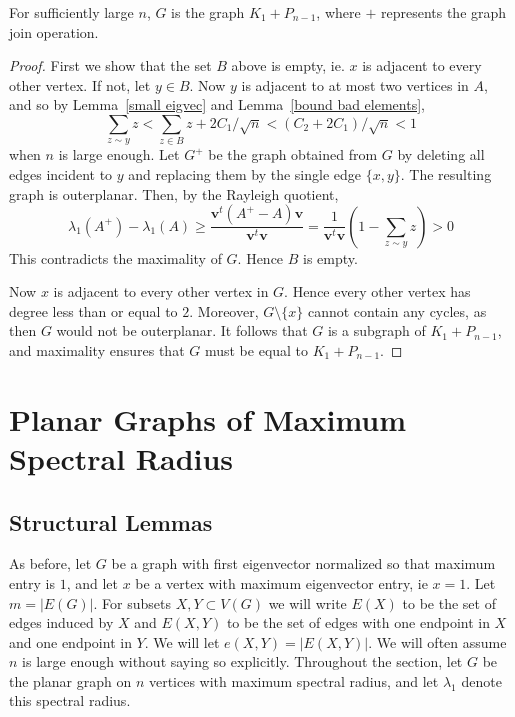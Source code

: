 \begin{theorem}
 For sufficiently large $n$, $G$ is the graph $K_1 + P_{n-1}$, where $+$ represents the graph join operation.
\end{theorem}
\begin{proof}
First we show that the set $B$ above is empty, ie. $x$ is adjacent
to every other vertex.  If not, let $y \in B$.  Now $y$ is adjacent to at
most two vertices in $A$, and so by Lemma~\ref{small eigvec} and Lemma~\ref{bound bad elements}, 
 \[ \sum_{z \sim y} z < \sum_{z \in B} z + 2 C_1 / \sqrt{n} < (C_2 + 2 C_1) / \sqrt{n} < 1\]
when $n$ is large enough.  Let $G^+$ be the graph obtained
from $G$ by deleting all edges incident to $y$ and replacing them by the single edge $\{x,y\}$.  The resulting graph is outerplanar.  Then,
by the Rayleigh quotient,
 \[ \lambda_1(A^+) - \lambda_1(A) \geq \frac{\textbf{v}^t(A^+ - A)\textbf{v}}{\textbf{v}^t\textbf{v}} = \frac{1}{\textbf{v}^t\textbf{v}} \left(1 - \sum_{z \sim y} z\right) > 0\]
This contradicts the maximality of $G$.  Hence $B$ is empty.


Now $x$ is adjacent to every other vertex in $G$.  Hence every other vertex has degree less than or equal to $2$.  Moreover,
$G \setminus \{x\}$ cannot contain any cycles, as then $G$ would not be outerplanar.
It follows that $G$ is a subgraph of $K_1 + P_{n-1}$, and maximality ensures that $G$ must be equal to $K_1 + P_{n-1}$.
\end{proof}

\section{Planar Graphs of Maximum Spectral Radius}\label{planar}

\subsection{Structural Lemmas}

As before, let $G$ be a graph with first eigenvector normalized so that maximum entry is $1$, and let $x$ be a vertex with maximum eigenvector entry, ie $x=1$. Let $m = |E(G)|$. For subsets $X, Y\subset V(G)$ we will write $E(X)$ to be the set of edges induced by $X$ and $E(X,Y)$ to be the set of edges with one endpoint in $X$ and one endpoint in $Y$. We will let $e(X,Y) = |E(X,Y)|$. We will often assume $n$ is large enough without saying so explicitly. Throughout the section, let $G$ be the planar graph on $n$ vertices with maximum spectral radius, and let $\lambda_1$ denote this spectral radius.


